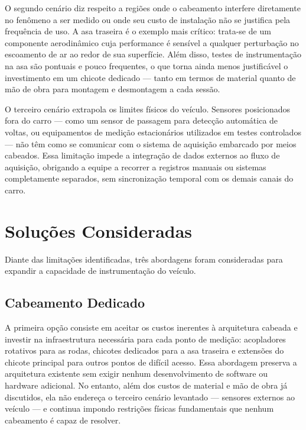 \documentclass{article}
\begin{document}
    O segundo cenário diz respeito a regiões onde o cabeamento interfere diretamente
    no fenômeno a ser medido ou onde seu custo de instalação não se justifica pela
    frequência de uso. A asa traseira é o exemplo mais crítico: trata-se de um componente
    aerodinâmico cuja performance é sensível a qualquer perturbação no escoamento
    de ar ao redor de sua superfície. Além disso, testes de instrumentação na asa
    são pontuais e pouco frequentes, o que torna ainda menos justificável o
    investimento em um chicote dedicado — tanto em termos de material quanto de
    mão de obra para montagem e desmontagem a cada sessão.

    O terceiro cenário extrapola os limites físicos do veículo. Sensores posicionados
    fora do carro — como um sensor de passagem para detecção automática de voltas,
    ou equipamentos de medição estacionários utilizados em testes controlados —
    não têm como se comunicar com o sistema de aquisição embarcado por meios
    cabeados. Essa limitação impede a integração de dados externos ao fluxo de aquisição,
    obrigando a equipe a recorrer a registros manuais ou sistemas completamente
    separados, sem sincronização temporal com os demais canais do carro.

    \section{Soluções Consideradas}

    Diante das limitações identificadas, três abordagens foram consideradas para
    expandir a capacidade de instrumentação do veículo.

    \subsection{Cabeamento Dedicado}

    A primeira opção consiste em aceitar os custos inerentes à arquitetura
    cabeada e investir na infraestrutura necessária para cada ponto de medição: acopladores
    rotativos para as rodas, chicotes dedicados para a asa traseira e extensões
    do chicote principal para outros pontos de difícil acesso. Essa abordagem preserva
    a arquitetura existente sem exigir nenhum desenvolvimento de software ou hardware
    adicional. No entanto, além dos custos de material e mão de obra já discutidos,
    ela não endereça o terceiro cenário levantado — sensores externos ao veículo
    — e continua impondo restrições físicas fundamentais que nenhum cabeamento é
    capaz de resolver.
\end{document}

